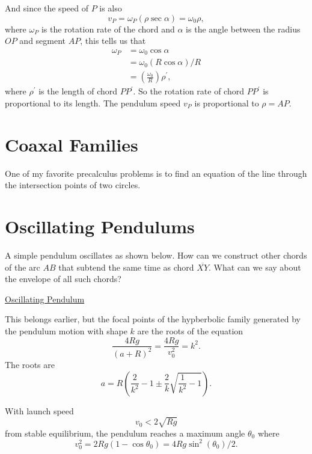 \documentclass{ximera}
\begin{document}
And since the speed of $P$ is also
\[
  v_P = \omega_P (\rho \sec\alpha)  = \omega_0 \rho , 
\]
where $\omega_P$ is the rotation rate of the chord and $\alpha$ is the angle between the radius $OP$ and segment $AP$, this tells us that
\begin{align*}
\omega_P &= \omega_0  \cos  \alpha  \\
                &= \omega_0 (R\cos \alpha) / R \\
                & = \left( \frac{\omega_0}{R} \right) \rho^\prime ,
\end{align*}
where $\rho^\prime$ is the length of chord $PP^\prime$. So the rotation rate of chord $PP^\prime$ is proportional to its length. The pendulum speed $v_P$ is proportional to $\rho = AP$.


\section{Coaxal Families}
One of my favorite precalculus problems is to find an equation of the line through the intersection points of two circles.


\section{Oscillating Pendulums}

\begin{exploration}
A simple pendulum oscillates as shown below. How can we construct other chords of the arc $AB$ that subtend the same time as chord $\overline{XY}$. What can we say about the envelope of all such chords?

\begin{onlineOnly}
    \begin{center}
\end{center}
\end{onlineOnly}

\href{https://www.desmos.com/calculator/pleca0vkjw}{Oscillating Pendulum}

\end{exploration}

This belongs earlier, but the focal points of the hypberbolic family generated by the pendulum motion with shape $k$ are the roots of the equation
\[
      \frac{4Rg}{(a+R)^2} = \frac{4Rg}{v_0^2} = k^2.
\]
The roots are
\[
      a = R \left(\frac{2}{k^2} -1  \pm \frac{2}{k}\sqrt{\frac{1}{k^2}-1} \right) . 
\]

With launch speed
\[
   v_0 < 2\sqrt{Rg}
\]
from stable equilibrium, the pendulum reaches a maximum angle $\theta_0$ where 
\[
    v_0^2 = 2Rg(1-\cos\theta_0) = 4Rg\sin^2 (\theta_0)/2 .
\]
\end{document}
